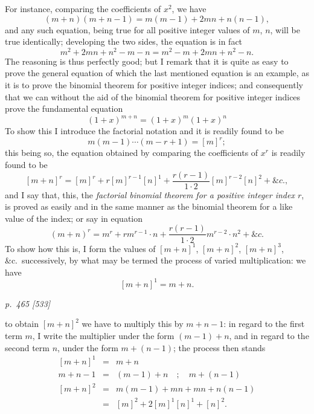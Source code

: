 \documentclass[11pt,a4paper]{article}
\theoremstyle{plain}
\theoremstyle{definition}
\begin{document}
For instance, comparing the coefficients of $x^2$, we have
\[
(m+n)(m+n-1)=m(m-1)+2mn+n(n-1),
\]
and any such equation, being true for all positive integer values of $m$, $n$, will be
true identically; developing the two sides, the equation is in fact
\[
m^2+2mn+n^2-m-n=m^2-m+2mn+n^2-n.
\]
The reasoning is thus perfectly good; but I remark that it is quite as easy to prove
the general equation of which the last mentioned equation is an example, as it is to
prove the binomial theorem for positive integer indices; and consequently that we can
without the aid of the binomial theorem for positive integer indices prove the fundamental
equation
\[
(1 + x)^{m+n} = (1 + x)^m (1 + x)^n
\]
To show this I introduce the factorial notation and it is readily found to
be
\[
m(m-1)\cdots(m-r+1)=[m]^r;
\]
this being so, the equation obtained by comparing the coefficients of $x^r$ is readily found
to be
\[
[m+n]^r=[m]^r+r[m]^{r-1}[n]^1+\frac{r(r-1)}{1\cdot2}[m]^{r-2}[n]^2+\&c.,
\]
and I say that, this, the \textit{factorial binomial theorem for a positive integer index $r$},
is proved as easily and in the same manner as the binomial theorem for a like value
of the index; or say in equation
\[
(m + n)^r = m^r + rm^{r-1}\cdot n + \frac{r(r-1)}{1\cdot 2}m^{r-2}\cdot n^2 + \&c.
\]
To show how this is, I form the values of $[m+n]^1$, $[m+n]^2$, $[m+n]^3$, \&c.\ successively,
by what may be termed the process of varied multiplication: we have
\[
[m + n]^1 = m + n.
\]

\clearpage

\bigskip
\textit{p.~465 [533]}
\smallskip

\noindent
to obtain $[m+n]^2$ we have to multiply this by $m+n-1$: in regard to the first term
$m$, I write the multiplier under the form $(m-1)+n$, and in regard to the second
term $n$, under the form $m + (n - 1)$; the process then stands
\[
\begin{array}{rcc}
[m+n]^1&=&m+n\\
m+n-1&=&(m-1)+n\quad;\quad m+(n-1)\\ \hline
[m+n]^2&=&m(m-1)+mn+mn+n(n-1)\\
&=&[m]^2+2[m]^1[n]^1+[n]^2.
\end{array}
\]
\end{document}
